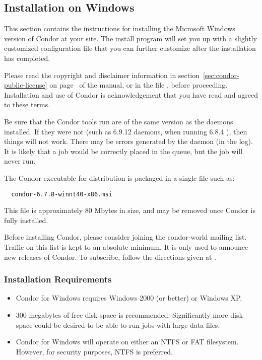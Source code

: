 \subsection{\label{sec:Windows-Install}Installation on Windows}

This section contains the instructions for installing the Microsoft
Windows version of Condor at your site.  
The install program will set you up with a slightly customized configuration
file that you can further customize after the installation has completed.

Please read the copyright and disclaimer information in 
section~\ref{sec:condor-public-license} on
page~\pageref{sec:condor-public-license} of the manual, or in the
file 
, before proceeding.  Installation and
use of Condor is acknowledgement that you have read and agreed to these
terms.

Be sure that the Condor tools run are of the same version
as the daemons installed.
If they were not (such as 6.9.12 daemons, when running 6.8.4 ),
then things will not work.
There may be errors generated by the  daemon (in the log).
It is likely that a job would be correctly placed in the queue,
but the job will never run.

The Condor executable for distribution is packaged in
a single file such as:
\begin{verbatim}
  condor-6.7.8-winnt40-x86.msi
\end{verbatim}

This file is approximately 80 Mbytes in size, and may be
removed once Condor is fully installed.

Before installing Condor, please consider joining the condor-world mailing
list.  Traffic on this list is kept to an absolute minimum.  It is only
used to announce new releases of Condor.
To subscribe, follow the directions given at
.

\subsubsection{Installation Requirements}

\begin{itemize}

\item Condor for Windows requires Windows 2000 (or better) or Windows XP.

\item 300 megabytes of free disk space is recommended.  Significantly more 
disk space could be desired to be able to run jobs with large data files.

\item Condor for Windows will operate on either an NTFS or FAT filesystem.  However, for security purposes, NTFS is preferred.

\end{itemize}

